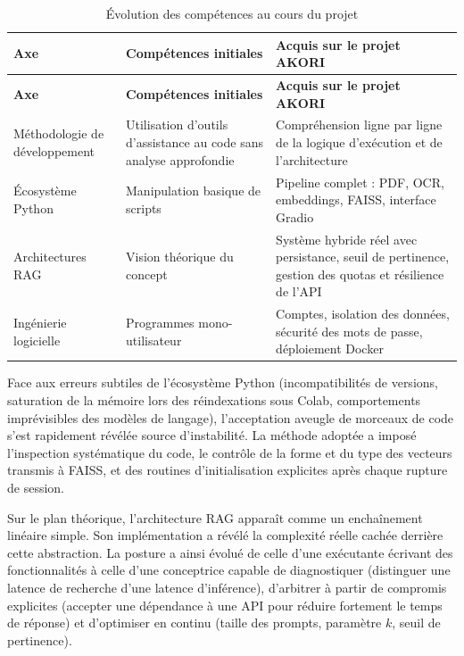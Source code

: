 \documentclass[12pt,a4paper,oneside]{report}
\begin{document}
\begin{longtable}{p{}|p{}|p{}}
\caption{Évolution des compétences au cours du projet}\label{tab:competences}\\
\hline
\textbf{Axe} & \textbf{Compétences initiales} & \textbf{Acquis sur le projet AKORI} \\ \hline
\endfirsthead
\hline
\textbf{Axe} & \textbf{Compétences initiales} & \textbf{Acquis sur le projet AKORI} \\ \hline
\endhead
Méthodologie de développement & Utilisation d'outils d'assistance au code sans analyse approfondie & Compréhension ligne par ligne de la logique d'exécution et de l'architecture \\ \hline
Écosystème Python & Manipulation basique de scripts & Pipeline complet : PDF, OCR, embeddings, FAISS, interface Gradio \\ \hline
Architectures RAG & Vision théorique du concept & Système hybride réel avec persistance, seuil de pertinence, gestion des quotas et résilience de l'API \\ \hline
Ingénierie logicielle & Programmes mono-utilisateur & Comptes, isolation des données, sécurité des mots de passe, déploiement Docker \\ \hline
\end{longtable}

Face aux erreurs subtiles de l'écosystème Python (incompatibilités de versions, saturation de la mémoire lors des réindexations sous Colab, comportements imprévisibles des modèles de langage), l'acceptation aveugle de morceaux de code s'est rapidement révélée source d'instabilité. La méthode adoptée a imposé l'inspection systématique du code, le contrôle de la forme et du type des vecteurs transmis à FAISS, et des routines d'initialisation explicites après chaque rupture de session.

Sur le plan théorique, l'architecture RAG apparaît comme un enchaînement linéaire simple. Son implémentation a révélé la complexité réelle cachée derrière cette abstraction. La posture a ainsi évolué de celle d'une exécutante écrivant des fonctionnalités à celle d'une conceptrice capable de diagnostiquer (distinguer une latence de recherche d'une latence d'inférence), d'arbitrer à partir de compromis explicites (accepter une dépendance à une API pour réduire fortement le temps de réponse) et d'optimiser en continu (taille des prompts, paramètre $k$, seuil de pertinence).

\end{document}
